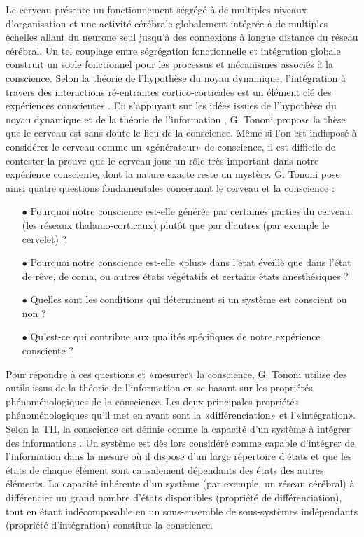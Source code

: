 Le cerveau présente un fonctionnement ségrégé à de multiples niveaux d'organisation et une activité cérébrale globalement intégrée à de multiples échelles allant du neurone seul jusqu'à des connexions à longue distance du réseau cérébral. 
Un tel couplage entre ségrégation fonctionnelle et intégration globale construit un socle fonctionnel pour les processus et mécanismes associés à la conscience. 
Selon la théorie de l'hypothèse du noyau dynamique, l'intégration à travers des interactions ré-entrantes cortico-corticales est un élément clé des expériences conscientes \citep{edelman2000reentry, edelman2003naturalizing, tononi1998consciousness}. 
En s'appuyant sur les idées issues de l'hypothèse du noyau dynamique et de la théorie de l'information \citep{tononi2003measuring, tononi2004information, tononi2008consciousness}, G. Tononi propose la thèse que le cerveau est sans doute le lieu de la conscience. 
Même si l'on est indisposé à considérer le cerveau comme un «générateur» de conscience, il est difficile de contester la preuve que le cerveau joue un rôle très important dans notre expérience consciente, dont la nature exacte reste un mystère. 
G. Tononi pose ainsi quatre questions fondamentales concernant le cerveau et la conscience :

\begin{itemize}
\item[$\bullet$] Pourquoi notre conscience est-elle générée par certaines parties du cerveau (les réseaux thalamo-corticaux) plutôt que par d'autres (par exemple le cervelet) ?
\item[$\bullet$] Pourquoi notre conscience est-elle «plus» dans l'état éveillé que dans l'état de rêve, de coma, ou autres états végétatifs et certains états anesthésiques ?
\item[$\bullet$] Quelles sont les conditions qui déterminent si un système est conscient ou non ?
\item[$\bullet$] Qu'est-ce qui contribue aux qualités spécifiques de notre expérience consciente ? 
\end{itemize} 

Pour répondre à ces questions et «mesurer» la conscience, G. Tononi utilise des outils issus de la théorie de l'information en se basant sur les propriétés phénoménologiques de la conscience. 
Les deux principales propriétés phénoménologiques qu'il met en avant sont la «différenciation» et l'«intégration».
Selon la TII, la conscience est définie comme la capacité d'un système à intégrer des informations \citep{balduzzi2008integrated, tononi2011integrated, tononi2016integrated, oizumi2014phenomenology}. 
Un système est dès lors considéré comme capable d'intégrer de l'information dans la mesure où il dispose d'un large répertoire d'états et que les états de chaque élément sont causalement dépendants des états des autres éléments. 
La capacité inhérente d'un système (par exemple, un réseau cérébral) à différencier un grand nombre d'états disponibles (propriété de différenciation), tout en étant indécomposable en un sous-ensemble de sous-systèmes indépendants (propriété d'intégration) constitue la conscience. 

